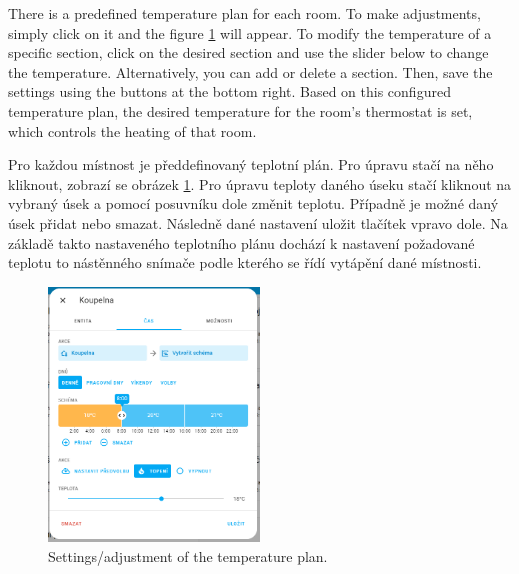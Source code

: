 \begin{English}
There is a predefined temperature plan for each room. To make adjustments, simply click on it and the figure \ref{fig:temperature-plan-thermostat} will appear. To modify the temperature of a specific section, click on the desired section and use the slider below to change the temperature. Alternatively, you can add or delete a section. Then, save the settings using the buttons at the bottom right. Based on this configured temperature plan, the desired temperature for the room's thermostat is set, which controls the heating of that room.
\end{English}

\begin{Czech}
Pro každou místnost je předdefinovaný teplotní plán. Pro úpravu stačí na něho kliknout, zobrazí se obrázek \ref{fig:temperature-plan-thermostat}. Pro úpravu teploty daného úseku stačí kliknout na vybraný úsek a pomocí posuvníku dole změnit teplotu. Případně je možné daný úsek přidat nebo smazat. Následně dané nastavení uložit tlačítek vpravo dole. Na základě takto nastaveného teplotního plánu dochází k nastavení požadované teplotu to nástěnného snímače podle kterého se řídí  vytápění dané místnosti.
\end{Czech}


\begin{English}
\begin{figure}[H]
    \centering
    \includegraphics[width=0.5\textwidth]{pictures/czech/software/temperature-plan-thermostat.png}
    \caption{Settings/adjustment of the temperature plan.}
    \label{fig:temperature-plan-thermostat}
\end{figure}
\end{English}

